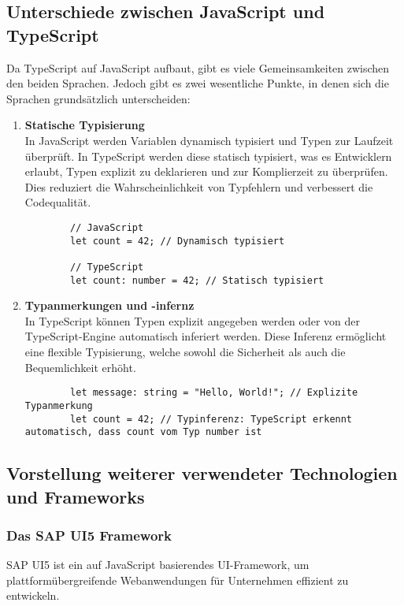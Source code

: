 \subsection[Unterschiede zwischen JavaScript und TypeScript]{Unterschiede zwischen JavaScript und TypeScript}
Da TypeScript auf JavaScript aufbaut, gibt es viele Gemeinsamkeiten zwischen den beiden Sprachen.
Jedoch gibt es zwei wesentliche Punkte, in denen sich die Sprachen grundsätzlich unterscheiden:

\begin{enumerate}
    \item \textbf{Statische Typisierung} \\
    In JavaScript werden Variablen dynamisch typisiert und Typen zur Laufzeit überprüft. In TypeScript werden diese statisch typisiert, was es Entwicklern erlaubt, Typen explizit zu deklarieren und zur Komplierzeit zu überprüfen.
    Dies reduziert die Wahrscheinlichkeit von Typfehlern und verbessert die Codequalität.
    \begin{lstlisting}
        // JavaScript
        let count = 42; // Dynamisch typisiert

        // TypeScript
        let count: number = 42; // Statisch typisiert
    \end{lstlisting}
    \item \textbf{Typanmerkungen und -infernz} \\
    In TypeScript können Typen explizit angegeben werden oder von der TypeScript-Engine automatisch inferiert werden.
    Diese Inferenz ermöglicht eine flexible Typisierung, welche sowohl die Sicherheit als auch die Bequemlichkeit erhöht.
    \begin{lstlisting}
        let message: string = "Hello, World!"; // Explizite Typanmerkung
        let count = 42; // Typinferenz: TypeScript erkennt automatisch, dass count vom Typ number ist
    \end{lstlisting}
\end{enumerate}

\subsection[Vorstellung weiterer verwendeter Technologien und Frameworks]{Vorstellung weiterer verwendeter Technologien und Frameworks}

\subsubsection[Das SAP UI5 Framework]{Das SAP UI5 Framework}
SAP UI5 ist ein auf JavaScript basierendes UI-Framework, um plattformübergreifende Webanwendungen für Unternehmen effizient zu entwickeln.

